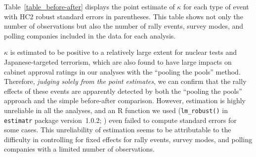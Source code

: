 \documentclass[12pt,letterpaper]{scrartcl}
\begin{document}
Table~\ref{table_before-after} displays the point estimate of $\kappa $ for each type of event with HC2 robust standard errors in parentheses. This table shows not only the number of observations but also the number of rally events, survey modes, and polling companies included in the data for each analysis.

$\kappa $ is estimated to be positive to a relatively large extent for nuclear tests and Japanese-targeted terrorism, which are also found to have large impacts on cabinet approval ratings in our analyses with the ``pooling the pools'' method. Therefore, \emph{judging solely from the point estimates}, we can confirm that the rally effects of these events are apparently detected by both the ``pooling the pools'' approach and the simple before-after comparison. However, estimation is highly unreliable in all the analyses, and an R function we used (\texttt{lm\_robust()} in \texttt{estimatr} package version~1.0.2; \citealt{Blair2024}) even failed to compute standard errors for some cases. This unreliability of estimation seems to be attributable to the difficulty in controlling for fixed effects for rally events, survey modes, and polling companies with a limited number of observations.
\end{document}
